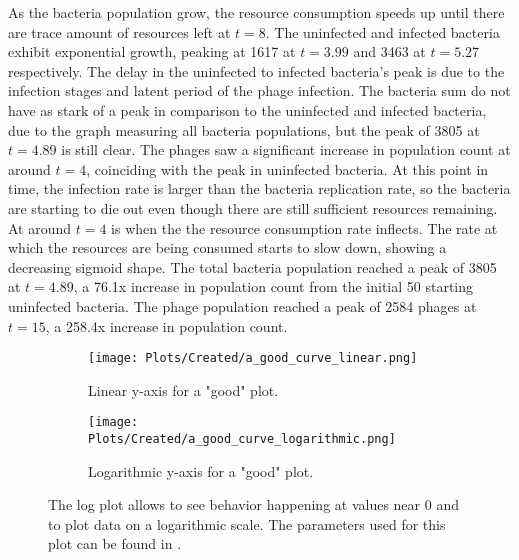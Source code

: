 As the bacteria population grow, the resource consumption speeds up until there are trace amount of resources left at $t=8$. 
The uninfected and infected bacteria exhibit exponential growth, peaking at 1617 at $t=3.99$ and 3463 at $t=5.27$ respectively. 
The delay in the uninfected to infected bacteria's peak is due to the infection stages and latent period of the phage infection. 
The bacteria sum do not have as stark of a peak in comparison to the uninfected and infected bacteria, due to the graph measuring all bacteria populations, but the peak of 3805 at $t=4.89$ is still clear. 
The phages saw a significant increase in population count at around $t=4$, coinciding with the peak in uninfected bacteria. 
At this point in time, the infection rate is larger than the bacteria replication rate, so the bacteria are starting to die out even though there are still sufficient resources remaining. 
At around $t=4$ is when the the resource consumption rate inflects. 
The rate at which the resources are being consumed starts to slow down, showing a decreasing sigmoid shape. 
The total bacteria population reached a peak of 3805 at $t=4.89$, a 76.1x increase in population count from the initial 50 starting uninfected bacteria. 
The phage population reached a peak of 2584 phages at $t=15$, a 258.4x increase in population count. 

\begin{figure}[h!]
    \centering
    \begin{subfigure}{1\linewidth}
        \centering
        \captionsetup{width=1\linewidth}
        \texttt{[image: Plots/Created/a\_good\_curve\_linear.png]}
        \caption{
            Linear y-axis for a "good" plot. 
        }
        \label{fig:created:a_good_curve_linear}
    \end{subfigure}
    \hfill
    \begin{subfigure}{1\linewidth}
        \centering
        \captionsetup{width=1\linewidth}
        \texttt{[image: Plots/Created/a\_good\_curve\_logarithmic.png]}
        \caption{
            Logarithmic y-axis for a "good" plot. 
        }
        \label{fig:created:a_good_curve_logarithmic}
    \end{subfigure}
    \caption{
        The log plot allows to see behavior happening at values near 0 and to plot data on a logarithmic scale. 
        The parameters used for this plot can be found in . 
    }
    \label{fig:created:a_good_curve}
\end{figure}

